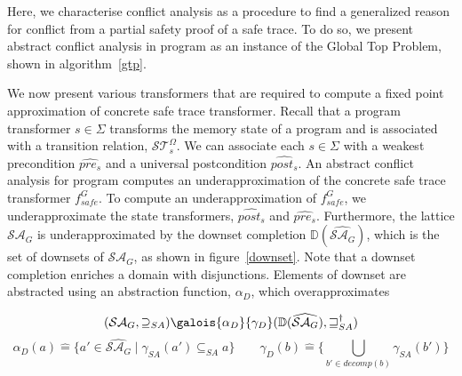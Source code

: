 Here, we characterise conflict analysis as a procedure to find a 
generalized reason for conflict from a partial safety proof of a safe 
trace. To do so, we present abstract conflict analysis in program as 
an instance of the Global Top Problem, shown in algorithm~\ref{gtp}.  


We now present various transformers that are required to compute a 
fixed point approximation of concrete safe trace transformer.  
Recall that a program transformer $s \in \Sigma$ transforms the memory state of a
program and is associated with a transition relation,
$\mathcal{ST}_{s}^{\Omega}$.  We can associate each $s \in \Sigma$ with a weakest
precondition $\widehat{pre_{s}}$ and a universal postcondition
$\widehat{post_{s}}$. 
%
%
An abstract conflict analysis for program computes an underapproximation of 
the concrete safe trace transformer $f_{safe}^G$.
To compute an underapproximation of $f_{safe}^{G}$, we underapproximate the
state transformers, $\widehat{post_s}$ and $\widehat{pre_s}$.  Furthermore, 
the lattice  $\mathcal{SA}_{G}$ is underapproximated by the downset 
completion $\mathbb{D}(\widehat{\mathcal{SA}_{G}})$, which is the set of 
downsets of $\mathcal{SA}_{G}$, as shown in figure~\ref{downset}.  Note 
that a downset completion enriches a domain with disjunctions.  Elements of 
downset are abstracted using an abstraction function, $\alpha_D$, which 
overapproximates  

%
\begin{proposition}
\[
   (\mathcal{SA}_{G},\supseteq_{SA})
   \galois{\alpha_{D}}{\gamma_{D}}
   (\mathbb{D}(\widehat{\mathcal{SA}_{G}}),\sqsupseteq_{SA}^\dagger) 
\]
  \[
    \alpha_{D}(a) \mathrel{\hat=} \{a' \in \widehat{\mathcal{SA}_G} \mid \gamma_{SA}(a')
    \subseteq_{SA} a \}
    \qquad
    \gamma_{D}(b) \mathrel{\hat=} \{\bigcup_{b' \in decomp(b)}
    \gamma_{SA}(b')\}
  \]
\end{proposition}
%


